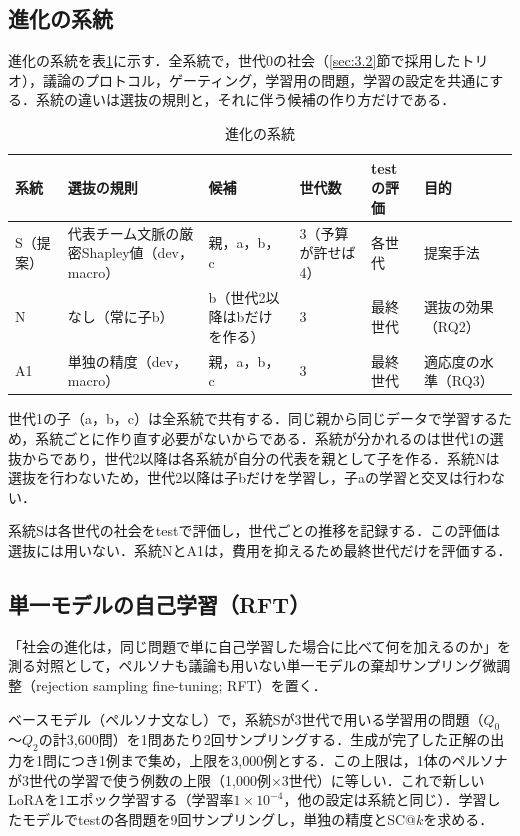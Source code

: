 \subsection{進化の系統}
\label{sec:4.4.1}

進化の系統を表\ref{tab:4.2}に示す．全系統で，世代0の社会（\ref{sec:3.2}節で採用したトリオ），議論のプロトコル，ゲーティング，学習用の問題，学習の設定を共通にする．系統の違いは選抜の規則と，それに伴う候補の作り方だけである．

\begin{table}[htbp]
\caption{進化の系統}
\label{tab:4.2}
\centering
\footnotesize
\setlength{\tabcolsep}{3pt}
\begin{tabular}{|l|p{3.1cm}|p{2.8cm}|p{1.2cm}|p{1.8cm}|p{3.0cm}|}
\hline
系統 & 選抜の規則 & 候補 & 世代数 & testの評価 & 目的 \\
\hline
S（提案） & 代表チーム文脈の厳密Shapley値（dev，macro） & 親，a，b，c & 3（予算が許せば4） & 各世代 & 提案手法 \\
\hline
N & なし（常に子b） & b（世代2以降はbだけを作る） & 3 & 最終世代 & 選抜の効果（RQ2） \\
\hline
A1 & 単独の精度（dev，macro） & 親，a，b，c & 3 & 最終世代 & 適応度の水準（RQ3） \\
\hline
\end{tabular}
\end{table}

世代1の子（a，b，c）は全系統で共有する．同じ親から同じデータで学習するため，系統ごとに作り直す必要がないからである．系統が分かれるのは世代1の選抜からであり，世代2以降は各系統が自分の代表を親として子を作る．系統Nは選抜を行わないため，世代2以降は子bだけを学習し，子aの学習と交叉は行わない．

系統Sは各世代の社会をtestで評価し，世代ごとの推移を記録する．この評価は選抜には用いない．系統NとA1は，費用を抑えるため最終世代だけを評価する．

\subsection{単一モデルの自己学習（RFT）}
\label{sec:4.4.2}

「社会の進化は，同じ問題で単に自己学習した場合に比べて何を加えるのか」を測る対照として，ペルソナも議論も用いない単一モデルの棄却サンプリング微調整（rejection sampling fine-tuning; RFT）\cite{zelikman2022star,yuan2023scaling}を置く．

ベースモデル（ペルソナ文なし）で，系統Sが3世代で用いる学習用の問題（$Q_0$〜$Q_2$の計3,600問）を1問あたり2回サンプリングする．生成が完了した正解の出力を1問につき1例まで集め，上限を3,000例とする．この上限は，1体のペルソナが3世代の学習で使う例数の上限（1,000例$\times$3世代）に等しい．これで新しいLoRAを1エポック学習する（学習率$1 \times 10^{-4}$，他の設定は系統と同じ）．学習したモデルでtestの各問題を9回サンプリングし，単独の精度とSC@$k$を求める．

